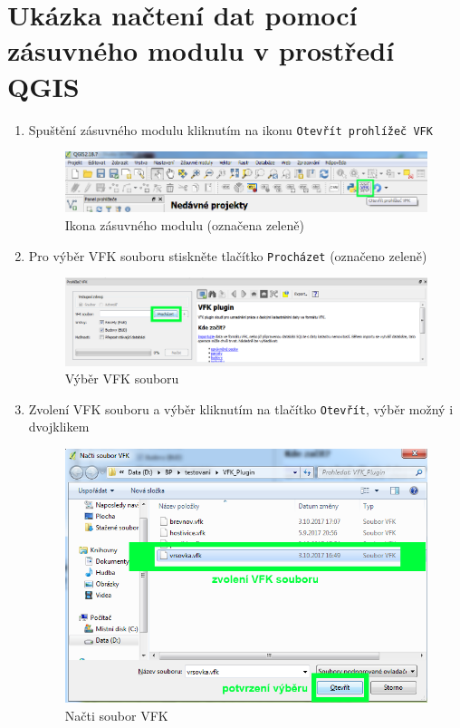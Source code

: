  \section{Ukázka načtení dat pomocí zásuvného modulu v prostředí QGIS}
 \label{sec:nacteni_dat_ukazka}
 \begin{enumerate}\bfseries
 \item{Spuštění zásuvného modulu kliknutím na ikonu \texttt{Otevřít prohlížeč VFK}}
  \begin{figure}[H]
	 \centering
      \includegraphics[width=15cm]{./pictures/nacteni_1kr.png}
      \caption{Ikona zásuvného modulu (označena zeleně)}
      \label{fig:1kr_nacteni}
  \end{figure}
  
  \newpage
  \item{Pro výběr VFK souboru stiskněte tlačítko \texttt{Procházet} (označeno zeleně)}
  \begin{figure}[H]
	 \centering
      \includegraphics[width=15cm]{./pictures/nacteni_2kr.png}
      \caption{Výběr VFK souboru}
      \label{fig:2kr_nacteni}
  \end{figure}
  
  \item{Zvolení VFK souboru a výběr kliknutím na tlačítko \texttt{Otevřít}, výběr možný i dvojklikem}
  \begin{figure}[H]
	 \centering
      \includegraphics[width=15cm]{./pictures/nacteni_3kr.png}
      \caption{Načti soubor VFK}
      \label{fig:3kr_nacteni}
  \end{figure}
  

\end{enumerate}
